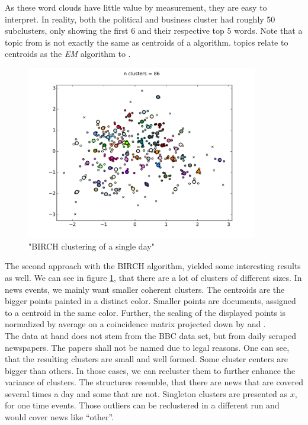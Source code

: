 As these word clouds have little value by measurement, they are easy to interpret. In reality, both the political and business cluster had roughly 50 subclusters, only showing the first 6 and their respective top 5 words. Note that a topic from \lda{} is not exactly the same as centroids of a \kmeans{} algorithm. \lda{} topics relate to centroids as the \emph{EM} algorithm to \kmeans{}.

  \begin{figure}[h!]
    \centering
      \includegraphics[width=0.9\textwidth]{birch_clustering.png}
      \caption{"BIRCH clustering of a single day"}
      \label{birch_clustering}
  \end{figure}

The second approach with the BIRCH algorithm, yielded some interesting results as well. We can see in figure \ref{birch_clustering}, that there are a lot of clusters of different sizes.
In news events, we mainly want smaller coherent clusters. The centroids are the bigger points painted in a distinct color. Smaller points are documents, assigned to a centroid in the same color. Further, the scaling of the displayed points is normalized by average on a coincidence matrix projected down by \lsa{} and \pca{}.\\

The data at hand does not stem from the BBC data set, but from daily scraped newspapers. The papers shall not be named due to legal reasons. One can see, that the resulting clusters are small and well formed. Some cluster centers are bigger than others. In those cases, we can recluster them to further enhance the variance of clusters. The structures resemble, that there are news that are covered several times a day and some that are not. Singleton clusters are presented as $x$, for one time events. Those outliers can be reclustered in a different run and would cover news like ``other''.

